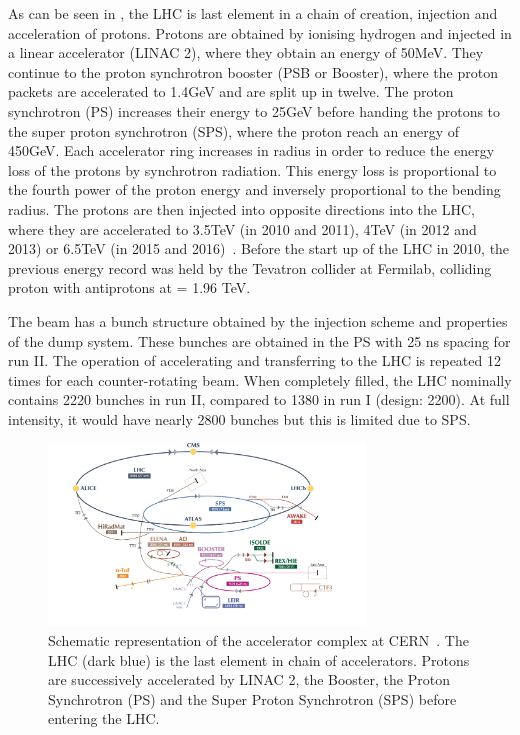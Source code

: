  As can be seen in , the LHC is last element in a chain of creation, injection and acceleration of protons. Protons are obtained by ionising hydrogen and injected in a linear accelerator (LINAC 2), where they obtain an energy of 50\si{ \MeV}. They continue to the proton synchrotron booster (PSB or Booster), where the proton packets are accelerated to 1.4\si{ \GeV} and are split up in twelve. The proton synchrotron (PS) increases their energy to 25\si{ \GeV} before handing the protons to the super proton synchrotron (SPS), where the proton reach an energy of 450\si{ \GeV}. Each accelerator ring increases in radius in order to reduce the energy loss of the protons by synchrotron radiation. This energy loss is proportional to the fourth power of the proton energy and inversely proportional to the bending radius. The protons are then injected into opposite directions into the LHC, where they are accelerated to 3.5\si{ \TeV} (in 2010 and 2011), 4\si{ \TeV} (in 2012 and 2013) or 6.5\si{ \TeV} (in 2015 and 2016)~\cite{Wenninger:2254678}. Before the start up of the LHC in 2010, the previous energy record was held by the Tevatron collider at Fermilab, colliding proton with antiprotons at \com = 1.96 \si{ \TeV}.
 
 The beam has a bunch structure obtained by the injection scheme and properties of the dump system. These bunches are obtained in the PS with 25 \si{ \nano \s} spacing for run II. The operation of accelerating and transferring to the LHC is repeated 12 times for each counter-rotating beam.  When completely filled, the LHC nominally contains 2220 bunches in run II, compared to 1380 in run I (design: 2200). At full intensity, it would have nearly 2800 bunches but this is limited due to SPS. 
 
 \begin{figure}[h]
	\centering
	\includegraphics[width=0.75\textwidth]{2_ExperimentalSetup/Figures/CCC-v2016}
	\caption{Schematic representation of the accelerator complex at CERN~\cite{DeMelis:2197559}. The LHC (dark blue) is the last element in chain of accelerators. Protons are successively accelerated by LINAC 2, the Booster, the Proton Synchrotron (PS) and the Super Proton Synchrotron (SPS) before entering the LHC.}
	\label{fig:LHCchain}
\end{figure}

